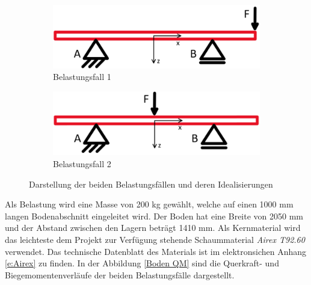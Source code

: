\begin{figure}[!ht]
  \centering
    \begin{subfigure}{.5\textwidth}
      \centering
      \includegraphics[width=.8\linewidth]{04_figures/Boden Fall1.png}
      \caption{Belastungsfall 1}
      \label{Belastungsfall 1}
    \end{subfigure}%
    \begin{subfigure}{.5\textwidth}
      \centering
      \includegraphics[width=.8\linewidth]{04_figures/Boden Fall2.png}
      \caption{Belastungsfall 2}
      \label{Belastungsfall 2}
    \end{subfigure}%
  \caption{Darstellung der beiden Belastungsfällen und deren Idealisierungen}
\label{Boden Idealisierung}
\end{figure}

Als Belastung wird eine Masse von 200 kg gewählt, welche auf einen 1000 mm langen Bodenabschnitt eingeleitet wird. Der Boden hat eine Breite von 2050 mm und der Abstand zwischen den Lagern beträgt 1410 mm. Als Kernmaterial wird das leichteste dem Projekt zur Verfügung stehende Schaummaterial \emph{Airex T92.60} verwendet. Das technische Datenblatt des Materials ist im elektronsichen Anhang \ref{e:Airex} zu finden. In der Abbildung \ref{Boden QM} sind die Querkraft- und Biegemomentenverläufe der beiden Belastungsfälle dargestellt.

